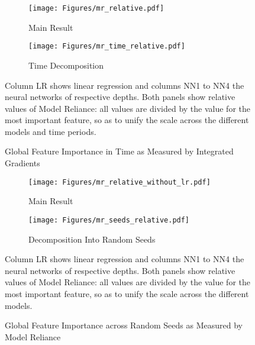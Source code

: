 \begin{figure}	
	\centering		
	\begin{subfigure}[t]{\textwidth}
		\texttt{[image: Figures/mr\_relative.pdf]}
		\caption{Main Result}
		\label{fig:mr_time_main}
	\end{subfigure}
	
	\begin{subfigure}[t]{\textwidth}
		\centering
		\texttt{[image: Figures/mr\_time\_relative.pdf]}
		\caption{Time Decomposition}
		\label{fig:mr_time_relative}
	\end{subfigure}
	\caption{Global Feature Importance in Time as Measured by Integrated Gradients}
	\label{fig:mr_time}
	\medskip
	\small
	Column LR shows linear regression and columns NN1 to NN4 the neural networks of respective depths. Both panels show relative values of Model Reliance: all values are divided by the value for the most important feature, so as to unify the scale across the different models and time periods. 
\end{figure}

\begin{figure}	
	\centering		
	\begin{subfigure}[t]{\textwidth}
		\texttt{[image: Figures/mr\_relative\_without\_lr.pdf]}
		\caption{Main Result}
		\label{fig:mr_seeds_main}
	\end{subfigure}
	
	\begin{subfigure}[t]{\textwidth}
		\centering
		\texttt{[image: Figures/mr\_seeds\_relative.pdf]}
		\caption{Decomposition Into Random Seeds}
		\label{fig:mr_seeds_relative}
	\end{subfigure}
	\caption{Global Feature Importance across Random Seeds as Measured by Model Reliance}
	\label{fig:mr_seeds}
	\medskip
	\small
	Column LR shows linear regression and columns NN1 to NN4 the neural networks of respective depths. Both panels show relative values of Model Reliance: all values are divided by the value for the most important feature, so as to unify the scale across the different models.
\end{figure}